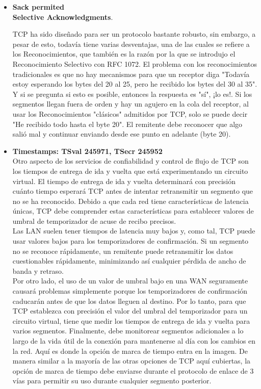\documentclass[osajnl,twocolumn,showpacs,superscriptaddress,10pt]{revtex4-1} %
\begin{document}
\begin{itemize}
    \item \textbf{Sack permited} \\

    \textbf{Selective Acknowledgments}.
    
    TCP ha sido diseñado para ser un protocolo bastante robusto, sin embargo, a pesar de esto, todavía tiene varias 
    desventajas, una de las cuales se refiere a los Reconocimientos, que también es la razón por la que se introdujo 
    el Reconocimiento Selectivo con RFC 1072. El problema con los reconocimientos tradicionales es que no hay 
    mecanismos para que un receptor diga "Todavía estoy esperando los bytes del 20 al 25, pero he recibido los bytes del 30 al 35". 
    Y si se pregunta si esto es posible, entonces la respuesta es "sí", ¡lo es!. Si los segmentos llegan fuera de orden y 
    hay un agujero en la cola del receptor, al usar los Reconocimientos "clásicos" admitidos por TCP, solo se puede decir 
    "He recibido todo hasta el byte 20". El remitente debe reconocer que algo salió mal y continuar enviando desde ese 
    punto en adelante (byte 20). \\

    \item \textbf{Timestamps: TSval 245971, TSecr 245952} \\

    Otro aspecto de los servicios de confiabilidad y control de flujo de TCP son los tiempos de entrega de ida y vuelta que 
    está experimentando un circuito virtual. El tiempo de entrega de ida y vuelta determinará con precisión cuánto tiempo 
    esperará TCP antes de intentar retransmitir un segmento que no se ha reconocido. Debido a que cada red tiene características 
    de latencia únicas, TCP debe comprender estas características para establecer valores de umbral de temporizador de acuse de recibo precisos. \\ 
    
    Las LAN suelen tener tiempos de latencia muy bajos y, como tal, TCP puede usar valores bajos para los temporizadores de confirmación. 
    Si un segmento no se reconoce rápidamente, un remitente puede retransmitir los datos cuestionables rápidamente, minimizando 
    así cualquier pérdida de ancho de banda y retraso. \\
    
    Por otro lado, el uso de un valor de umbral bajo en una WAN seguramente causará problemas simplemente porque los temporizadores 
    de confirmación caducarán antes de que los datos lleguen al destino. Por lo tanto, para que TCP establezca con precisión el valor 
    del umbral del temporizador para un circuito virtual, tiene que medir los tiempos de entrega de ida y vuelta para varios segmentos. 
    Finalmente, debe monitorear segmentos adicionales a lo largo de la vida útil de la conexión para mantenerse al día con los cambios 
    en la red. Aquí es donde la opción de marca de tiempo entra en la imagen. De manera similar a la mayoría de las otras opciones de 
    TCP aquí cubiertas, la opción de marca de tiempo debe enviarse durante el protocolo de enlace de 3 vías para permitir su uso durante 
    cualquier segmento posterior.  \\


\end{itemize}
\end{document}
